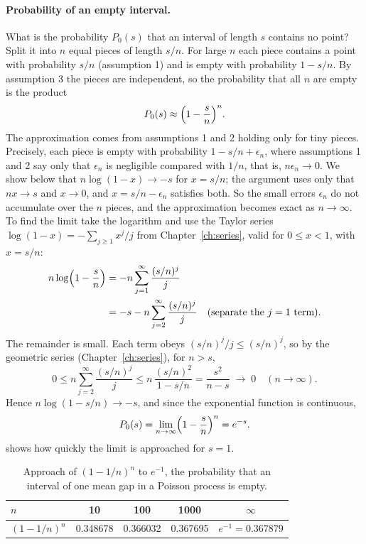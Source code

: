 \paragraph{Probability of an empty interval.} What is the probability $P_0(s)$ that an interval of length $s$ contains no point? Split it into $n$ equal pieces of length $s/n$. For large $n$ each piece contains a point with probability $s/n$ (assumption 1) and is empty with probability $1-s/n$. By assumption 3 the pieces are independent, so the probability that all $n$ are empty is the product
\[
P_0(s) \approx \Bigl(1-\frac sn\Bigr)^n .
\]
The approximation comes from assumptions 1 and 2 holding only for tiny pieces. Precisely, each piece is empty with probability $1-s/n+\epsilon_n$, where assumptions 1 and 2 say only that $\epsilon_n$ is negligible compared with $1/n$, that is, $n\epsilon_n\to0$. We show below that $n\log(1-x)\to-s$ for $x=s/n$; the argument uses only that $nx\to s$ and $x\to0$, and $x=s/n-\epsilon_n$ satisfies both. So the small errors $\epsilon_n$ do not accumulate over the $n$ pieces, and the approximation becomes exact as $n\to\infty$. To find the limit take the logarithm and use the Taylor series $\log(1-x)=-\sum_{j\ge1}x^j/j$ from Chapter~\ref{ch:series}, valid for $0\le x<1$, with $x=s/n$:
\begin{align*}
n\log\Bigl(1-\frac sn\Bigr) &= -n\sum_{j=1}^{\infty}\frac{(s/n)^j}{j}\\
&= -s - n\sum_{j=2}^{\infty}\frac{(s/n)^j}{j} \quad\text{(separate the $j=1$ term)}.
\end{align*}
The remainder is small. Each term obeys $(s/n)^j/j\le (s/n)^j$, so by the geometric series (Chapter~\ref{ch:series}), for $n>s$,
\[
0\le n\sum_{j=2}^{\infty}\frac{(s/n)^j}{j} \le n\,\frac{(s/n)^2}{1-s/n} = \frac{s^2}{n-s}\;\longrightarrow\;0 \quad (n\to\infty).
\]
Hence $n\log(1-s/n)\to -s$, and since the exponential function is continuous,
\begin{equation}
P_0(s) = \lim_{n\to\infty}\Bigl(1-\frac sn\Bigr)^n = e^{-s}.
\label{eq:probability-empty}
\end{equation}
 shows how quickly the limit is approached for $s=1$.

\begin{table}[htbp]\centering
\caption{Approach of $(1-1/n)^n$ to $e^{-1}$, the probability that an interval of one mean gap in a Poisson process is empty.}
\label{tab:probability-limit}
\begin{tabular}{lcccc}
\toprule
$n$ & 10 & 100 & 1000 & $\infty$ \\
\midrule
$(1-1/n)^n$ & 0.348678 & 0.366032 & 0.367695 & $e^{-1}=0.367879$\\
\bottomrule
\end{tabular}
\end{table}

